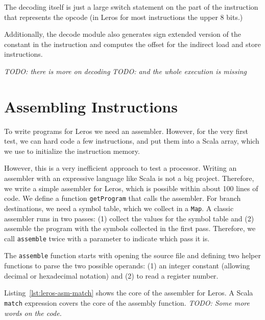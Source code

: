 \documentclass[%
    10pt,
    headinclude, footexclude,
    openright, %
    notitlepage,
    cleardoubleempty,
    headsepline,
    pointlessnumbers,
    bibtotoc, idxtotoc,
    ]{scrbook}
\newcommand{\code}[1]{{\lstinline[basicstyle=\small\ttfamily]{#1}}}
\newcommand{\todo}[1]{{\emph{TODO: #1}}}
\begin{document}

\noindent The decoding itself is just a large switch statement on the part of the
instruction that represents the opcode (in Leros for most instructions the upper
8 bits.)


Additionally, the decode module also generates sign extended version of the
constant in the instruction and computes the offset for the indirect load and
store instructions.

\todo{there is more on decoding}
\todo{and the whole execution is missing}

\section{Assembling Instructions}


To write programs for Leros we need an assembler. However, for the very first
test, we can hard code a few instructions, and put them into a Scala array,
which we use to initialize the instruction memory.


\noindent However, this is a very inefficient approach to test a processor.
Writing an assembler with an expressive language like Scala is not a big project.
Therefore, we write a simple assembler for Leros, which is possible within about
100 lines of code. We define a function \code{getProgram} that calls the assembler.
For branch destinations, we need a symbol table, which we collect in a \code{Map}.
A classic assembler runs in two passes: (1) collect the values for the symbol table
and (2) assemble the program with the symbols collected in the first pass.
Therefore, we call \code{assemble} twice with a parameter to indicate which pass it is.


The \code{assemble} function starts with opening the source file
and defining two helper functions to parse the two possible operands: (1) an
integer constant (allowing decimal or hexadecimal notation) and (2) to read
a register number.


Listing~\ref{lst:leros-asm-match} shows the core of the assembler for Leros.
A Scala \code{match} expression covers the core of the assembly function.
\todo{Some more words on the code.}
\end{document}
